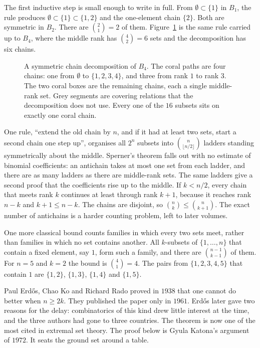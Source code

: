 The first inductive step is small enough to write in full. From $\emptyset\subset\{1\}$ in $B_1$, the rule produces $\emptyset\subset\{1\}\subset\{1,2\}$ and the one-element chain $\{2\}$. Both are symmetric in $B_2$. There are $\binom21=2$ of them. Figure~\ref{orders:fig:scd} is the same rule carried up to $B_4$, where the middle rank has $\binom42=6$ sets and the decomposition has six chains.

\begin{figure}[ht]
\centering
{}
\caption{A symmetric chain decomposition of $B_4$. The coral paths are four chains: one from $\emptyset$ to $\{1,2,3,4\}$, and three from rank $1$ to rank $3$. The two coral boxes are the remaining chains, each a single middle-rank set. Grey segments are covering relations that the decomposition does not use. Every one of the $16$ subsets sits on exactly one coral chain.}
\label{orders:fig:scd}
\end{figure}

\begin{beauty}
One rule, ``extend the old chain by $n$, and if it had at least two sets, start a second chain one step up'', organises all $2^n$ subsets into $\binom n{\lfloor n/2\rfloor}$ ladders standing symmetrically about the middle. Sperner's theorem falls out with no estimate of binomial coefficients: an antichain takes at most one set from each ladder, and there are as many ladders as there are middle-rank sets. The same ladders give a second proof that the coefficients rise up to the middle. If $k<n/2$, every chain that meets rank $k$ continues at least through rank $k+1$, because it reaches rank $n-k$ and $k+1\le n-k$. The chains are disjoint, so $\binom nk\le\binom n{k+1}$. The exact number of antichains is a harder counting problem, left to later volumes.
\end{beauty}

One more classical bound counts families in which every two sets meet, rather than families in which no set contains another. All $k$-subsets of $\{1,\dots,n\}$ that contain a fixed element, say $1$, form such a family, and there are $\binom{n-1}{k-1}$ of them. For $n=5$ and $k=2$ the bound is $\binom41=4$. The pairs from $\{1,2,3,4,5\}$ that contain $1$ are $\{1,2\}$, $\{1,3\}$, $\{1,4\}$ and $\{1,5\}$.

Paul Erd\H os, Chao Ko and Richard Rado proved in $1938$ that one cannot do better when $n\ge 2k$. They published the paper only in $1961$. Erd\H os later gave two reasons for the delay: combinatorics of this kind drew little interest at the time, and the three authors had gone to three countries. The theorem is now one of the most cited in extremal set theory. The proof below is Gyula Katona's argument of $1972$. It seats the ground set around a table.


